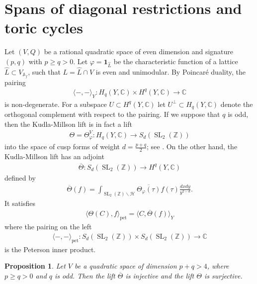 \documentclass[11pt]{article} %
\newcommand{\8}{\infty}
\newcommand{\Z}{\mathbb{Z}}
\newcommand{\id}{\mathbf{1}}
\newcommand{\SL}{\operatorname{SL}}
\newcommand{\HH}{\mathscr{H}}
\newcommand{\A}{\mathbb{A}}
\newcommand{\C}{\mathbb{C}}
\newcommand{\fin}{f}
\theoremstyle{mytheoremstyle}
\newtheorem{prop}[thm]{Proposition}
\theoremstyle{remark}
\numberwithin{equation}{section}
\begin{document}
\section{Spans of diagonal restrictions and toric cycles}\label{spans} Let $(V,Q)$ be a rational quadratic space of even dimension and signature $(p,q)$ with $p\geq q >0$. Let $\varphi=\id_{\widehat{L}}$ be the characteristic function of a lattice $\widehat{L} \subset V_{\A_\fin}$, such that $L=\widehat{L} \cap V$ is even and unimodular. 
By Poincaré duality, the pairing
\begin{align} \label{pairing1}
    \langle - , -  \rangle_Y \colon H_q(Y,\C) \times H^q(Y,\C) \longrightarrow \C
\end{align}
is non-degenerate. For a subspace ${ U} \subset H^q(Y,\C)$ let ${ U}^\perp \subset H_q(Y,\C)$ denote the orthogonal complement with respect to the pairing. If we suppose that $q$ is odd, then the Kudla-Millson lift is in fact a lift
\begin{align}
    \Theta=\Theta^V_\varphi \colon H_q(Y,\C) \longrightarrow S_{d}(\SL_2(\Z))
\end{align}
into the space of cusp forms of weight $d=\frac{p+q}{2}$; see \cite[Theorem.~2]{KMIHES}.
On the other hand, the Kudla-Millson lift has an adjoint
\begin{align}
    \overline{\Theta} \colon S_{d}(\SL_2(\Z)) \longrightarrow H^q(Y,\C)
\end{align}
defined by
\begin{align}
    \overline{\Theta}(f)=\int_{\SL_2(\Z) \backslash \HH}\overline{\Theta_\varphi(\tau)} f(\tau)\frac{dxdy}{y^{2-d}}.
\end{align}
It satisfies 
\begin{align}
    \langle \Theta(C),f \rangle_{\operatorname{pet}}=\langle C,\overline{\Theta}(f) \rangle_Y
\end{align}
where the pairing on the left 
\begin{align}
    \langle -,-\rangle_{\operatorname{pet}} \colon S_{d}(\SL_2(\Z)) \times S_{d}(\SL_2(\Z)) \longrightarrow \C
\end{align}
is the Peterson inner product.
\begin{prop} Let $V$ be a quadratic space of dimension $p+q>4$, where $p \geq q>0$ and $q$ is odd. Then the lift $\overline{\Theta}$ is injective and the lift $\Theta$ is surjective.    
\end{prop}
\end{document}
